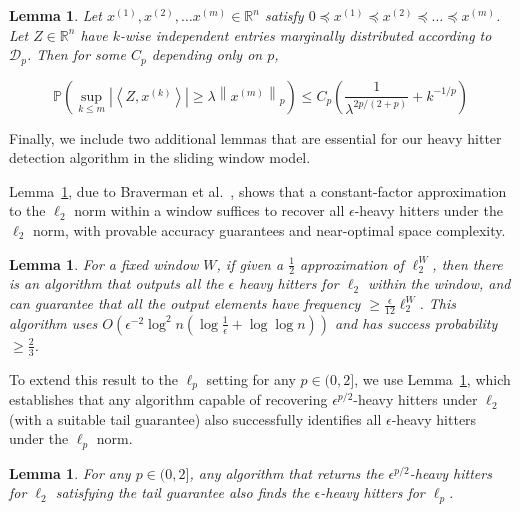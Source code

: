 \documentclass{article}
\theoremstyle{plain}
\newtheorem{lem}[theorem]{Lemma}
\begin{document}
\begin{lem}\label{prefix bound} \cite{blasiok2017continuous} Let $x^{(1)}, x^{(2)}, \ldots x^{(m)} \in \mathbb{R}^n$ satisfy $0 \preceq x^{(1)} \preceq x^{(2)} \preceq \ldots \preceq x^{(m)}$. Let $Z \in \mathbb{R}^n$ have $k$-wise independent entries marginally distributed according to $\mathcal{D}_p$. Then for some $C_p$ depending only on $p$,

$$
\mathbb{P}\left(\sup _{k \leq m}\left|\left\langle Z, x^{(k)}\right\rangle\right| \geq \lambda\left\|x^{(m)}\right\|_p\right) \leq C_p\left(\frac{1}{\lambda^{2 p /(2+p)}}+k^{-1 / p}\right)
$$

\end{lem}

Finally, we include two additional lemmas that are essential for our heavy hitter detection algorithm in the sliding window model.

Lemma~\ref{2}, due to Braverman et al.~\cite{braverman2018nearly}, shows that a constant-factor approximation to the $\ell_2$ norm within a window suffices to recover all $\epsilon$-heavy hitters under the $\ell_2$ norm, with provable accuracy guarantees and near-optimal space complexity.

\begin{lem}\label{2}\cite{braverman2018nearly}
    For a fixed window $W$, if given a $\frac 12$ approximation of $\ell_2 ^ {W}$, then there is an algorithm that outputs all the $\epsilon$ heavy hitters for $\ell_2$ within the window, and can guarantee that all the output elements have frequency $\ge \frac{\epsilon}{12} \ell_2 ^ W$. This algorithm uses $O(\epsilon ^ {-2} \log ^ 2n (\log \frac 1{\epsilon}+\log \log n))$ and has success probability $\ge \frac 23$.
\end{lem}

To extend this result to the $\ell_p$ setting for any $p \in (0,2]$, we use Lemma~\ref{heavyhitter}, which establishes that any algorithm capable of recovering $\epsilon^{p/2}$-heavy hitters under $\ell_2$ (with a suitable tail guarantee) also successfully identifies all $\epsilon$-heavy hitters under the $\ell_p$ norm.

\begin{lem}\cite{heavyhitter} \label{heavyhitter}For any $p \in(0,2]$, any algorithm that returns the $\epsilon^{p / 2}$-heavy hitters for $\ell_2$ satisfying the tail guarantee also finds the $\epsilon$-heavy hitters for $\ell_p$.
\end{lem}
\end{document}
